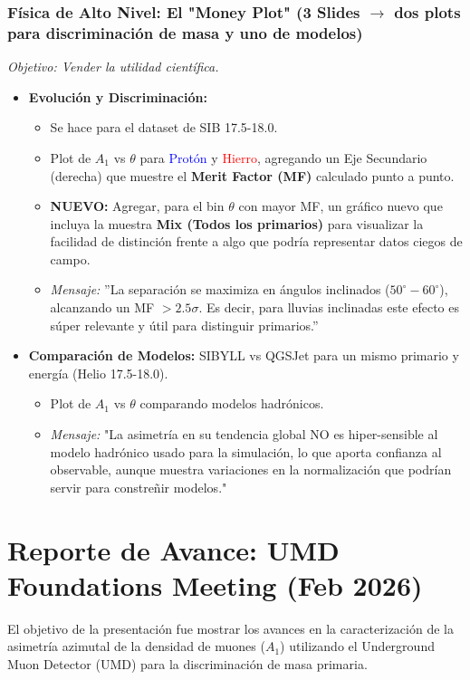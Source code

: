 \subsubsection{Física de Alto Nivel: El "Money Plot" (3 Slides $\rightarrow$ dos plots para discriminación de masa y uno de modelos)}
\textit{Objetivo: Vender la utilidad científica.}
\begin{itemize}
	\item \textbf{Evolución y Discriminación:}
	\begin{itemize}
		\item Se hace para el dataset de SIB 17.5-18.0.
		\item Plot de $A_1$ vs $\theta$ para \textcolor{blue}{Protón} y \textcolor{red}{Hierro}, agregando un Eje Secundario (derecha) que muestre el \textbf{Merit Factor (MF)} calculado punto a punto.
		\item \textbf{NUEVO:} Agregar, para el bin $\theta$ con mayor MF, un gráfico nuevo que incluya la muestra \textbf{Mix (Todos los primarios)} para visualizar la facilidad de distinción frente a algo que podría representar datos ciegos de campo.
		\item \textit{Mensaje:} ''La separación se maximiza en ángulos inclinados ($50^\circ-60^\circ$), alcanzando un MF $> 2.5\sigma$. Es decir, para lluvias inclinadas este efecto es súper relevante y útil para distinguir primarios.''
	\end{itemize}
	
	\item \textbf{Comparación de Modelos:} SIBYLL vs QGSJet para un mismo primario y energía (Helio 17.5-18.0).
	\begin{itemize}
		\item Plot de $A_1$ vs $\theta$ comparando modelos hadrónicos.
		\item \textit{Mensaje:} "La asimetría en su tendencia global NO es hiper-sensible al modelo hadrónico usado para la simulación, lo que aporta confianza al observable, aunque muestra variaciones en la normalización que podrían servir para constreñir modelos."
	\end{itemize}
\end{itemize}


\section{Reporte de Avance: UMD Foundations Meeting (Feb 2026)}

El objetivo de la presentación fue mostrar los avances en la caracterización de la asimetría azimutal de la densidad de muones ($A_1$) utilizando el Underground Muon Detector (UMD) para la discriminación de masa primaria. 

